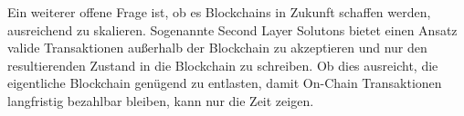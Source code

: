 \noindent Ein weiterer offene Frage ist, ob es Blockchains in Zukunft schaffen werden, ausreichend zu skalieren. Sogenannte Second Layer Solutons bietet einen Ansatz valide Transaktionen außerhalb der Blockchain zu akzeptieren und nur den resultierenden Zustand in die Blockchain zu schreiben. Ob dies ausreicht, die eigentliche Blockchain genügend zu entlasten, damit On-Chain Transaktionen langfristig bezahlbar bleiben, kann nur die Zeit zeigen.


